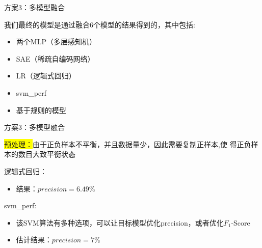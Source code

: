 \documentclass{beamer}
\begin{document}
\begin{frame}{方案3：多模型融合}

我们最终的模型是通过融合6个模型的结果得到的，其中包括:
\begin{itemize}
\item 两个MLP（多层感知机）
\item SAE（稀疏自编码网络）
\item LR（逻辑式回归）
\item svm\_perf
\item 基于规则的模型
\end{itemize}

\end{frame}

\begin{frame}{方案3：多模型融合}

\colorbox{yellow}{预处理：}由于正负样本不平衡，并且数据量少，因此需要复制正样本,使
得正负样本的数目大致平衡状态

\vspace{2em}

逻辑式回归：
\begin{itemize}
\item 结果：$precision = 6.49\%$
\end{itemize}

\vspace{1em}

svm\_perf:
\begin{itemize}
\item 该SVM算法有多种选项，可以让目标模型优化precision，或者优化$F_1$-Score
\item 估计结果：$precision = 7\%$
\end{itemize}

\end{frame}
\end{document}
